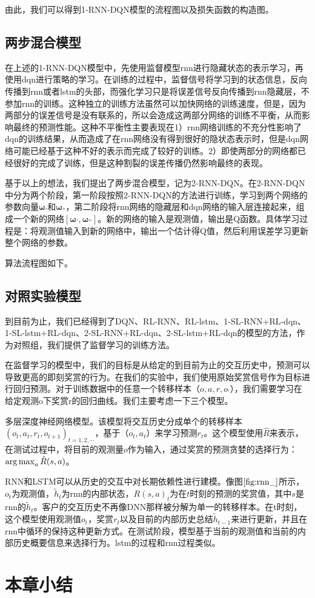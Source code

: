 由此，我们可以得到1-RNN-DQN模型的流程图以及损失函数的构造图。

\subsection{两步混合模型}
在上述的1-RNN-DQN模型中，先使用监督模型rnn进行隐藏状态的表示学习，再使用dqn进行策略的学习。在训练的过程中，监督信号将学习到的状态信息，反向传播到rnn或者lstm的头部，而强化学习只是将误差信号反向传播到rnn隐藏层，不参加rnn的训练。这种独立的训练方法虽然可以加快网络的训练速度，但是，因为两部分的误差信号是没有联系的，所以会造成这两部分网络的训练不平衡，从而影响最终的预测性能。这种不平衡性主要表现在1）rnn网络训练的不充分性影响了dqn的训练结果，从而造成了在rnn网络没有得到很好的隐状态表示时，但是dqn网络可能已经基于这种不好的表示而完成了较好的训练。2）即使两部分的网络都已经很好的完成了训练，但是这种割裂的误差传播仍然影响最终的表现。

基于以上的想法，我们提出了两步混合模型，记为2-RNN-DQN。在2-RNN-DQN中分为两个阶段，第一阶段按照2-RNN-DQN的方法进行训练，学习到两个网络的参数向量$\mathbf{\omega_{'}}$和$\mathbf{\omega_{''}}$，第二阶段将rnn网络的隐藏层和dqn网络的输入层连接起来，组成一个新的网络$[\mathbf{\omega_{'}},\mathbf{\omega_{''}}]$。新的网络的输入是观测值，输出是Q函数。具体学习过程是：将观测值输入到新的网络中，输出一个估计得Q值，然后利用误差学习更新整个网络的参数。

算法流程图如下。

\subsection{对照实验模型}

到目前为止，我们已经得到了DQN、RL-RNN、RL-lstm、1-SL-RNN+RL-dqn、1-SL-lstm+RL-dqn、2-SL-RNN+RL-dqn、2-SL-lstm+RL-dqn的模型的方法，作为对照组，我们提供了监督学习的训练方法。

在监督学习的模型中，我们的目标是从给定的到目前为止的交互历史中，预测可以导致更高的即刻奖赏的行为。在我们的实验中，我们使用原始奖赏信号作为目标进行回归预测。对于训练数据中的任意一个转移样本（$o,a,r,o_{'}$），我们需要学习在给定观测o下奖赏r的回归曲线。我们主要考虑一下三个模型。

多层深度神经网络模型。该模型将交互历史分成单个的转移样本${(o_{t}, a_{t}, r_{t}, o_{t+1})}_{t=1,2,\cdots}$，基于（$o_{t},a_{t}$）来学习预测$r_{t}$。这个模型使用$\hat{R}$来表示，在测试过程中，将目前的观测量$o$作为输入，通过奖赏的预测贪婪的选择行为：$\operatorname*{arg\,max}_{a}\hat{R}(s,a)$。

RNN和LSTM可以从历史的交互中对长期依赖性进行建模。像图$\ref{fig:rnn_}$所示，$o_{t}$为观测值，$\tilde{h}_{t}$为rnn的内部状态，$R(s,a)_{t}$为在$t$时刻的预测的奖赏值，其中$s$是rnn的$\tilde{h}_{t}$。客户的交互历史不再像DNN那样被分解为单一的转移样本。在t时刻，这个模型使用观测值$o_{t}$，奖赏$r_{t}$以及目前的内部历史总结$\tilde{h}_{t-1}$来进行更新，并且在rnn中循环的保持这种更新方式。在测试阶段，模型基于当前的观测值和当前的内部历史概要信息来选择行为。lstm的过程和rnn过程类似。


\section{本章小结}